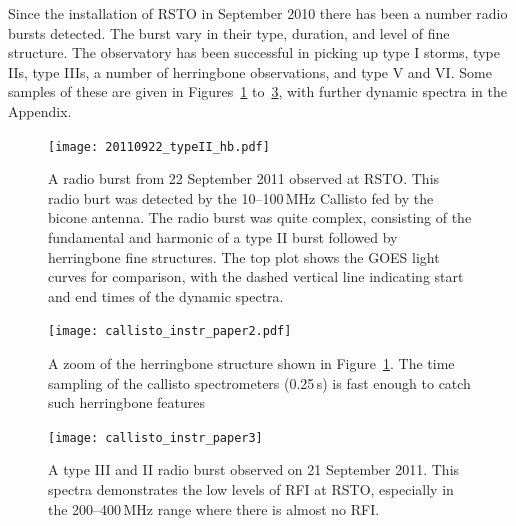 Since the installation of RSTO in September 2010 there has been a number radio bursts detected. The burst vary in their type, duration, and level of fine structure. The observatory has been successful in picking up type I storms, type IIs, type IIIs, a number of herringbone observations, and type V and VI. Some samples of these are given in Figures~\ref{fig:typeII_hb} to~\ref{fig:type_III}, with further dynamic spectra in the Appendix.
\begin{figure}[!t]
\begin{center}
\texttt{[image: 20110922\_typeII\_hb.pdf]}
\caption[Callisto observations type II and herringbones]{A radio burst from 22 September 2011 observed at RSTO. This radio burt was detected by the 10--100\,MHz Callisto fed by the bicone antenna. The radio burst was quite complex, consisting of the fundamental and harmonic of a type II burst followed by herringbone fine structures. The top plot shows the GOES light curves for comparison, with the dashed vertical line indicating start and end times of the dynamic spectra.}
\label{fig:typeII_hb}
\end{center}

\end{figure}
\begin{figure}[!t]
\begin{center}
\texttt{[image: callisto\_instr\_paper2.pdf]}
\caption[Callisto observations type II and herringbones]{A zoom of the herringbone structure shown in Figure~\ref{fig:typeII_hb}. The time sampling of the callisto spectrometers (0.25\,s) is fast enough to catch such herringbone features}
\label{fig:herringbones}

\end{center}
\end{figure}
\begin{figure}[!t]
\begin{center}
\texttt{[image: callisto\_instr\_paper3]}
\caption[Callisto observations type II and herringbones]{A type III and II radio burst observed on 21 September 2011. This spectra demonstrates the low levels of RFI at RSTO, especially in the 200--400\,MHz range where there is almost no RFI.}
\label{fig:type_III}
\end{center}
\end{figure}


